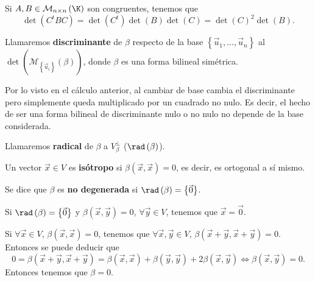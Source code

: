 Si $\displaystyle A,B \in \mathcal{M}_{ n \times n }\left(\K\right) $ son congruentes, tenemos que 
\[ \det\left(C^{t}BC\right) = \det\left(C^{t}\right)\det\left(B\right)\det\left(C\right) = \det\left(C\right)^{2}\det\left(B\right) .\]
\begin{fdefinition}[Discriminante]
	\normalfont Llamaremos \textbf{discriminante} de $\displaystyle \beta  $ respecto de la base $\displaystyle \left\{ \vec{u}_{1}, \ldots , \vec{u}_{n}\right\}  $ al $\displaystyle \det\left(\mathcal{M}_{ \left\{ \vec{u}_{i}\right\} }\left(\beta\right)\right) $, donde $\displaystyle \beta  $ es una forma bilineal simétrica.
\end{fdefinition}
\begin{observation}
\normalfont Por lo visto en el cálculo anterior, al cambiar de base cambia el discriminante pero simplemente queda multiplicado por un cuadrado no nulo. Es decir, el hecho de ser una forma bilineal de discriminante nulo o no nulo no depende de la base considerada.
\end{observation}
\begin{fdefinition}[Radical]
\normalfont Llamaremos \textbf{radical} de $\displaystyle \beta  $ a $\displaystyle V^{\perp }_{\beta } $ ($\displaystyle \rad\left(\beta\right) $).
\end{fdefinition}
\begin{fdefinition}[Isótropo]
\normalfont Un vector $\displaystyle \vec{x} \in V $ es \textbf{isótropo} si $\displaystyle \beta\left(\vec{x}, \vec{x}\right) = 0 $, es decir, es ortogonal a sí mismo.
\end{fdefinition}
\begin{fdefinition}[]
	\normalfont Se dice que $\displaystyle \beta  $ es \textbf{no degenerada} si $\displaystyle \rad\left(\beta \right) = \left\{ \vec{0}\right\}  $.
\end{fdefinition}
\begin{observation}
\normalfont Si $\displaystyle \rad\left(\beta \right) = \left\{ \vec{0}\right\}  $ y $\displaystyle \beta\left(\vec{x}, \vec{y}\right) = 0 $, $\displaystyle \forall \vec{y} \in V $, tenemos que $\displaystyle \vec{x} = \vec{0} $.
\end{observation}
\begin{observation}
\normalfont Si $\displaystyle \forall \vec{x} \in V $, $\displaystyle \beta\left(\vec{x}, \vec{x}\right)=0 $, tenemos que $\displaystyle \forall \vec{x}, \vec{y} \in V $, $\displaystyle \beta\left(\vec{x} + \vec{y}, \vec{x} + \vec{y}\right) =0$. Entonces se puede deducir que
\[ 0 = \beta\left(\vec{x} + \vec{y}, \vec{x} + \vec{y}\right) = \beta\left(\vec{x}, \vec{x}\right) + \beta\left(\vec{y} , \vec{y}\right) + 2 \beta\left(\vec{x}, \vec{y}\right) \iff \beta\left(\vec{x}, \vec{y}\right) = 0 .\]
Entonces tenemos que $\displaystyle \beta = 0 $.
\end{observation}
